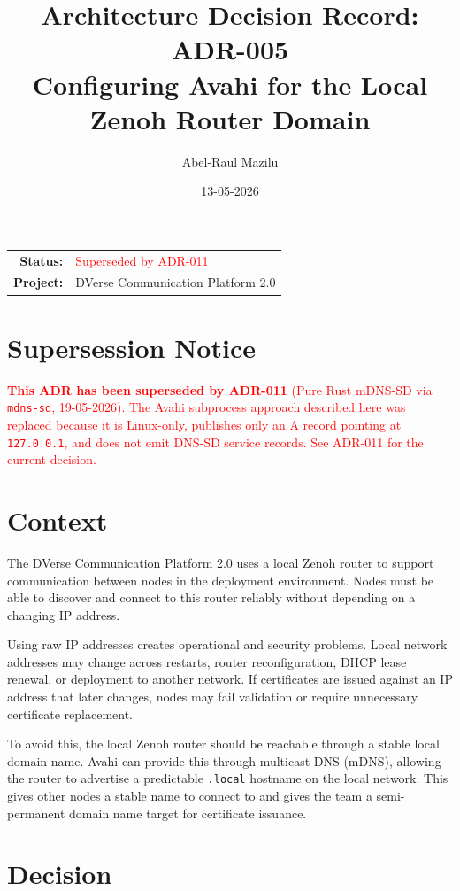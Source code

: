 \documentclass[11pt]{article}
\title{Architecture Decision Record: ADR-005\\
\large Configuring Avahi for the Local Zenoh Router Domain}
\author{Abel-Raul Mazilu}
\date{13-05-2026}
\begin{document}
\maketitle

\begin{center}
\begin{tabular}{rl}
\textbf{Status:} & \textcolor{red}{Superseded by ADR-011} \\
\textbf{Project:} & DVerse Communication Platform 2.0 \\
\end{tabular}
\end{center}

\section*{Supersession Notice}

\textcolor{red}{\textbf{This ADR has been superseded by ADR-011} (Pure Rust mDNS-SD via \texttt{mdns-sd}, 19-05-2026). The Avahi subprocess approach described here was replaced because it is Linux-only, publishes only an A record pointing at \texttt{127.0.0.1}, and does not emit DNS-SD service records. See ADR-011 for the current decision.}

\section{Context}

The DVerse Communication Platform 2.0 uses a local Zenoh router to support communication between nodes in the deployment environment. Nodes must be able to discover and connect to this router reliably without depending on a changing IP address.

Using raw IP addresses creates operational and security problems. Local network addresses may change across restarts, router reconfiguration, DHCP lease renewal, or deployment to another network. If certificates are issued against an IP address that later changes, nodes may fail validation or require unnecessary certificate replacement.

To avoid this, the local Zenoh router should be reachable through a stable local domain name. Avahi can provide this through multicast DNS (mDNS), allowing the router to advertise a predictable \texttt{.local} hostname on the local network. This gives other nodes a stable name to connect to and gives the team a semi-permanent domain name target for certificate issuance.

\section{Decision}
\end{document}
